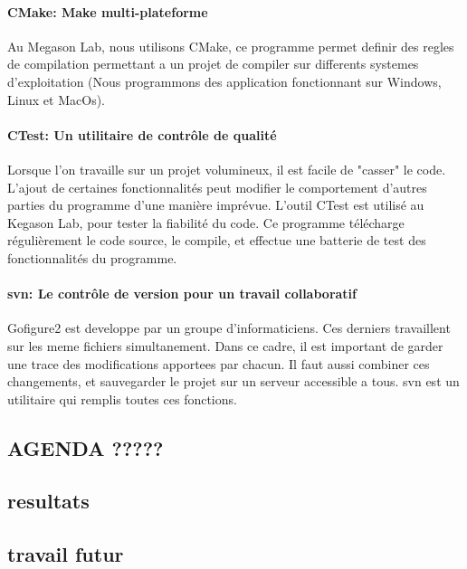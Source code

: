 \paragraph{CMake: Make multi-plateforme}
Au Megason Lab, nous utilisons CMake, ce programme permet definir des regles de compilation permettant a un projet de compiler sur differents systemes d'exploitation (Nous programmons des application fonctionnant sur Windows, Linux et MacOs).

\paragraph{CTest: Un utilitaire de contrôle de qualité}
Lorsque l'on travaille sur un projet volumineux, il est facile de "casser" le code. L'ajout de certaines fonctionnalités peut modifier le comportement d'autres parties du programme d'une manière imprévue. L'outil CTest est utilisé au Kegason Lab, pour tester la fiabilité du code. Ce programme télécharge régulièrement le code source, le compile, et effectue une batterie de test des fonctionnalités du programme.

\paragraph{svn: Le contrôle de version pour un travail collaboratif}
Gofigure2 est developpe par un groupe d'informaticiens. Ces derniers travaillent sur les meme fichiers simultanement. Dans ce cadre, il est important de garder une trace des modifications apportees par chacun. Il faut aussi combiner ces changements, et sauvegarder le projet sur un serveur accessible a tous. svn est un utilitaire qui remplis toutes ces fonctions.






\subsection{AGENDA ?????}



\subsection{resultats}

\subsection{travail futur}





